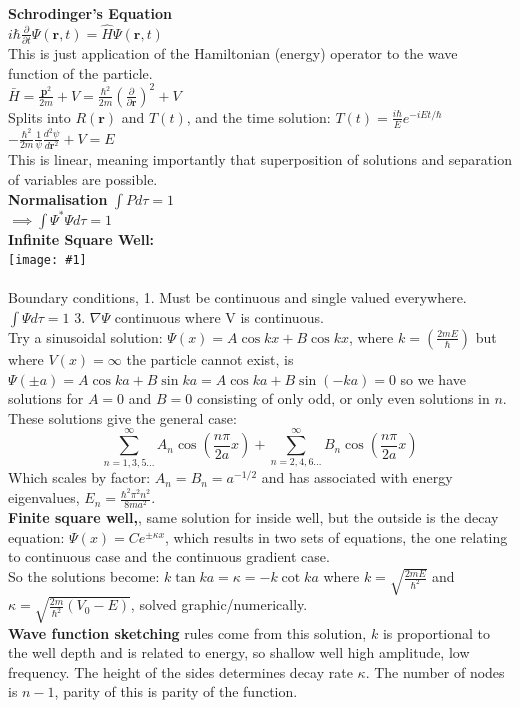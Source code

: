 \documentclass[10pt,landscape,a4paper]{article}
\newcommand{\inlineimagesize}[2]{\texttt{[image: \#1]}\\}
\newcommand{\tise}{\ensuremath{-\frac{\hbar^2}{2m}\frac{1}{\psi}\frac{d^2\psi}{d\textbf{r}^2} + V = E}}
\renewcommand{\^}[1]{\ensuremath{\hat{#1}}}
\begin{document}
\begin{multicols}{4}
	\textbf{Schrodinger's Equation}\\
	$ i\hbar \frac{\partial}{\partial t}\Psi(\textbf{r},t) = \hat{H}\Psi(\textbf{r},t) $\\
	This is just application of the Hamiltonian (energy) operator to the wave function of the particle. \\ 
	$ \bar{H} = \frac{\textbf{p}^2}{2m}+V = \frac{\hbar^2}{2m}(\frac{\partial}{\partial \textbf{r}})^2 + V $\\
	Splits into $ R(\textbf{r}) $ and $ T(t) $, and the time solution: $ T(t) = \frac{i\hbar}{E} e^{-iEt/\hbar} $\\
	\tise\\
	This is linear, meaning importantly that superposition of solutions and separation of variables are possible.\\
	\textbf{Normalisation} $ \int P d\tau = 1 $\\ $ \implies \int \Psi^*\Psi d\tau = 1 $ \\
	\textbf{Infinite Square Well:}\\
	\inlineimagesize{infsquarewell.png}{0.15}\\
	Boundary conditions, 1. Must be continuous and single valued everywhere.$ \int \Psi d\tau = 1 $ 3. $ \nabla\Psi $ continuous where V is continuous.\\
	Try a sinusoidal solution: $ \Psi(x) = A\cos kx + B\cos kx $, where $ k = \left(\frac{2mE}{\hbar}\right) $ but where $ V(x)=\infty $ the particle cannot exist, is $ \Psi(\pm a) = A\cos ka + B\sin ka = A\cos ka + B\sin (-ka) = 0 $ so we have solutions for $ A=0 $ and $ B=0 $ consisting of only odd, or only even solutions in $ n $. These solutions give the general case:
	\[ \sum_{n=1,3,5\ldots}^{\infty} A_n\cos(\frac{n\pi}{2a}x)+ \sum_{n=2,4,6\ldots}^{\infty} B_n\cos(\frac{n\pi}{2a}x) \] 
	Which scales by factor: $ A_n = B_n = a^{-1/2} $ and has associated with energy eigenvalues, $ E_n = \frac{\hbar^2\pi^2n^2}{8ma^2} $.\\
	\textbf{Finite square well,}, same solution for inside well, but the outside is the decay equation: $ \Psi(x) = Ce^{\pm\kappa x} $, which results in two sets of equations, the one relating to continuous case and the continuous gradient case.  \\
	So the solutions become: $ k\tan ka = \kappa = -k\cot ka $ where $ k=\sqrt{\frac{2mE}{\hbar^2}} $ and $ \kappa = \sqrt{\frac{2m}{\hbar^2}(V_0-E)} $, solved graphic/numerically.\\
	\textbf{Wave function sketching} rules come from this solution, $ k $ is proportional to the well depth and is related to energy, so shallow well high amplitude, low frequency. The height of the sides determines decay rate $ \kappa $. The number of nodes is $ n-1 $, parity of this is parity of the function.

\end{multicols}
\end{document}
